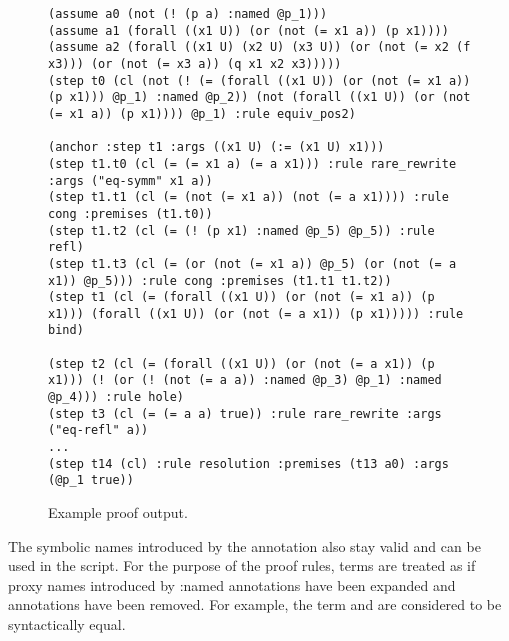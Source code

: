 \begin{figure}
\begin{lstlisting}[language=SMT]
(assume a0 (not (! (p a) :named @p_1)))
(assume a1 (forall ((x1 U)) (or (not (= x1 a)) (p x1))))
(assume a2 (forall ((x1 U) (x2 U) (x3 U)) (or (not (= x2 (f x3))) (or (not (= x3 a)) (q x1 x2 x3)))))
(step t0 (cl (not (! (= (forall ((x1 U)) (or (not (= x1 a)) (p x1))) @p_1) :named @p_2)) (not (forall ((x1 U)) (or (not (= x1 a)) (p x1)))) @p_1) :rule equiv_pos2)

(anchor :step t1 :args ((x1 U) (:= (x1 U) x1)))
(step t1.t0 (cl (= (= x1 a) (= a x1))) :rule rare_rewrite :args ("eq-symm" x1 a))
(step t1.t1 (cl (= (not (= x1 a)) (not (= a x1)))) :rule cong :premises (t1.t0))
(step t1.t2 (cl (= (! (p x1) :named @p_5) @p_5)) :rule refl)
(step t1.t3 (cl (= (or (not (= x1 a)) @p_5) (or (not (= a x1)) @p_5))) :rule cong :premises (t1.t1 t1.t2))
(step t1 (cl (= (forall ((x1 U)) (or (not (= x1 a)) (p x1))) (forall ((x1 U)) (or (not (= a x1)) (p x1))))) :rule bind)

(step t2 (cl (= (forall ((x1 U)) (or (not (= a x1)) (p x1))) (! (or (! (not (= a a)) :named @p_3) @p_1) :named @p_4))) :rule hole)
(step t3 (cl (= (= a a) true)) :rule rare_rewrite :args ("eq-refl" a))
...
(step t14 (cl) :rule resolution :premises (t13 a0) :args (@p_1 true))
\end{lstlisting}
\caption{Example proof output.}
\label{fig:syntax-alethe-example}
\end{figure}


The symbolic names introduced by the  annotation also stay valid and can be used in the script. For the purpose of
the proof rules, terms are treated as if proxy names introduced by :named annotations have been expanded and annotations have been removed.
For example, the term  and  are considered to be syntactically equal.


